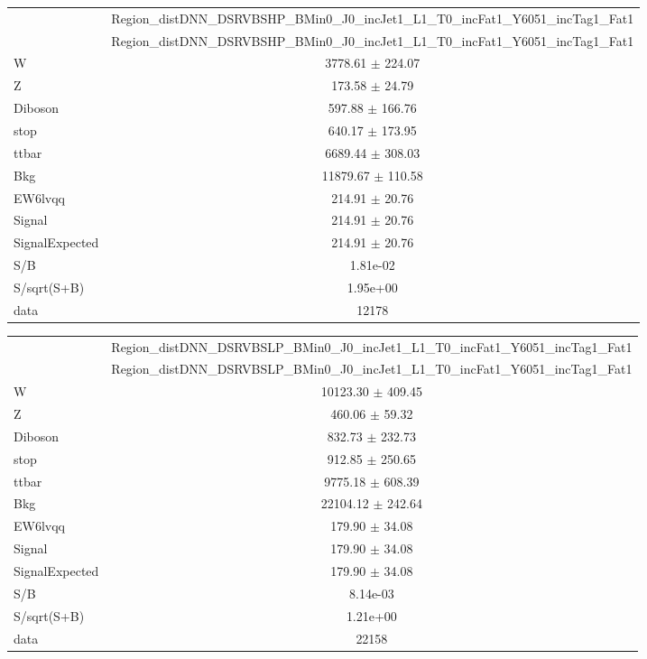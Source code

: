 \documentclass{article}
\begin{document}
\begin{table}
\centering
\small
\begin{tabular}{l|c|}
\cline{2-2}
 & \multicolumn{1}{c|}{Region\_distDNN\_DSRVBSHP\_BMin0\_J0\_incJet1\_L1\_T0\_incFat1\_Y6051\_incTag1\_Fat1}\\
\cline{2-2}
 & \multicolumn{1}{c|}{Region\_distDNN\_DSRVBSHP\_BMin0\_J0\_incJet1\_L1\_T0\_incFat1\_Y6051\_incTag1\_Fat1}\\ \hline
W & 3778.61 $\pm$ 224.07\\
Z & 173.58 $\pm$ 24.79\\
Diboson & 597.88 $\pm$ 166.76\\
stop & 640.17 $\pm$ 173.95\\
ttbar & 6689.44 $\pm$ 308.03\\
\hline
Bkg & 11879.67 $\pm$ 110.58\\
\hline
EW6lvqq & 214.91 $\pm$ 20.76\\
\hline
Signal & 214.91 $\pm$ 20.76\\
SignalExpected & 214.91 $\pm$ 20.76\\
\hline
S/B & 1.81e-02\\
S/sqrt(S+B) & 1.95e+00\\
\hline
data & 12178\\ \hline
\end{tabular}
\end{table}


\begin{table}
\centering
\small
\begin{tabular}{l|c|}
\cline{2-2}
 & \multicolumn{1}{c|}{Region\_distDNN\_DSRVBSLP\_BMin0\_J0\_incJet1\_L1\_T0\_incFat1\_Y6051\_incTag1\_Fat1}\\
\cline{2-2}
 & \multicolumn{1}{c|}{Region\_distDNN\_DSRVBSLP\_BMin0\_J0\_incJet1\_L1\_T0\_incFat1\_Y6051\_incTag1\_Fat1}\\ \hline
W & 10123.30 $\pm$ 409.45\\
Z & 460.06 $\pm$ 59.32\\
Diboson & 832.73 $\pm$ 232.73\\
stop & 912.85 $\pm$ 250.65\\
ttbar & 9775.18 $\pm$ 608.39\\
\hline
Bkg & 22104.12 $\pm$ 242.64\\
\hline
EW6lvqq & 179.90 $\pm$ 34.08\\
\hline
Signal & 179.90 $\pm$ 34.08\\
SignalExpected & 179.90 $\pm$ 34.08\\
\hline
S/B & 8.14e-03\\
S/sqrt(S+B) & 1.21e+00\\
\hline
data & 22158\\ \hline
\end{tabular}
\end{table}
\end{document}
